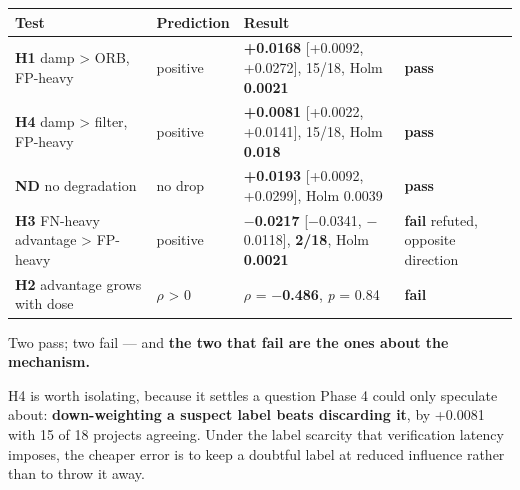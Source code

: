 \begin{longtable}[]{@{}
  >{\raggedright\arraybackslash}p{}
  >{\raggedright\arraybackslash}p{}
  >{\raggedright\arraybackslash}p{}
  >{\raggedright\arraybackslash}p{}@{}}
\toprule\noalign{}
\begin{minipage}[b]{\linewidth}\raggedright
Test
\end{minipage} & \begin{minipage}[b]{\linewidth}\raggedright
Prediction
\end{minipage} & \begin{minipage}[b]{\linewidth}\raggedright
Result
\end{minipage} & \begin{minipage}[b]{\linewidth}\raggedright
\end{minipage} \\
\midrule\noalign{}
\endhead
\bottomrule\noalign{}
\endlastfoot
\textbf{H1} damp \textgreater{} ORB, FP-heavy & positive &
\textbf{+0.0168} {[}+0.0092, +0.0272{]}, 15/18, Holm \textbf{0.0021} &
\textbf{pass} \\
\textbf{H4} damp \textgreater{} filter, FP-heavy & positive &
\textbf{+0.0081} {[}+0.0022, +0.0141{]}, 15/18, Holm \textbf{0.018} &
\textbf{pass} \\
\textbf{ND} no degradation & no drop & \textbf{+0.0193} {[}+0.0092,
+0.0299{]}, Holm 0.0039 & \textbf{pass} \\
\textbf{H3} FN-heavy advantage \textgreater{} FP-heavy & positive &
\textbf{\ensuremath{-}0.0217} {[}\ensuremath{-}0.0341, \ensuremath{-}0.0118{]}, \textbf{2/18}, Holm
\textbf{0.0021} & \textbf{fail} refuted, opposite direction \\
\textbf{H2} advantage grows with dose & \ensuremath{\rho} \textgreater{} 0 & \ensuremath{\rho} =
\textbf{\ensuremath{-}0.486}, \emph{p} = 0.84 & \textbf{fail} \\
\end{longtable}

Two pass; two fail --- and \textbf{the two that fail are the ones about
the mechanism.}

H4 is worth isolating, because it settles a question Phase 4 could only
speculate about: \textbf{down-weighting a suspect label beats discarding
it}, by +0.0081 with 15 of 18 projects agreeing. Under the label
scarcity that verification latency imposes, the cheaper error is to keep
a doubtful label at reduced influence rather than to throw it away.

